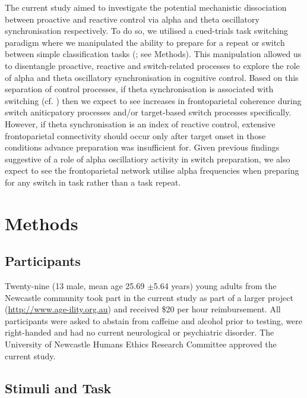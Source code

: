 \documentclass[preprint,authoryear,11pt,5p,times,twocolumns]{elsarticle}
\begin{document}
The current study aimed to investigate the potential mechanistic dissociation between proactive and reactive control via alpha and theta oscillatory synchronisation respectively. To do so, we utilised a cued-trials task switching paradigm where we manipulated the ability to prepare for a repeat or switch between simple classification tasks (\citealt{Karayanidis2009}; see Methods). This manipulation allowed us to disentangle proactive, reactive and switch-related processes to explore the role of alpha and theta oscillatory synchronisation in cognitive control. Based on this separation of control processes, if theta synchronisation is associated with switching (cf. \citealt{SausengTSWT}) then we expect to see increases in frontoparietal coherence during switch aniticpatory processes and/or target-based switch processes specifically. However, if theta synchronisation is an index of reactive control, extensive frontoparietal connectivity should occur only after target onset in those conditions advance preparation was insufficient for. Given previous findings suggestive of a role of alpha oscillatiory activity in switch preparation, we also expect to see the frontoparietal network utilise alpha frequencies when preparing for any switch in task rather than a task repeat.

\section{Methods}

\subsection{Participants}

Twenty-nine (13 male, mean age 25.69 $\pm$5.64 years) young adults from the Newcastle community took part in the current study as part of a larger project (\href{http://www.age-ility.org.au/}{http://www.age-ility.org.au}) and received \$20 per hour reimbursement. All participants were asked to abstain from caffeine and alcohol prior to testing, were right-handed and had no current neurological or psychiatric disorder. The University of Newcastle Humans Ethics Research Committee approved the current study. 

\subsection{Stimuli and Task}
\end{document}
